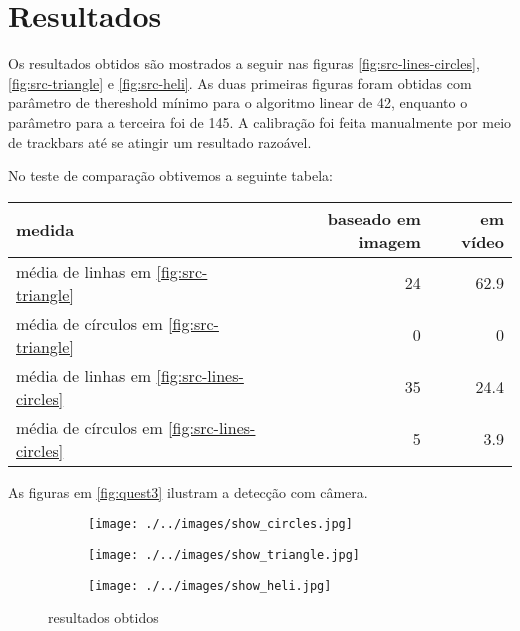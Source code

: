 \documentclass[journal]{IEEEtran}
\begin{document}
\section{Resultados}
Os resultados obtidos são mostrados a seguir nas figuras
\ref{fig:src-lines-circles}, \ref{fig:src-triangle} e \ref{fig:src-heli}. 
As duas primeiras figuras foram obtidas com parâmetro de thereshold mínimo
para o algoritmo linear de 42, enquanto o parâmetro para a terceira foi de 145.
A calibração foi feita manualmente por meio de trackbars até se atingir um resultado razoável.

No teste de comparação obtivemos a seguinte tabela:
\FloatBarrier
\begin{table}[!htp]
	\centering
	\begin{tabular}{|l|r|r|}\hline
	medida 						& baseado em imagem 					& em vídeo \\ \hline
	média de linhas em \ref{fig:src-triangle} & 24 & 62.9 \\ \hline
	média de círculos em \ref{fig:src-triangle} & 0 & 0\\ \hline
	média de linhas em \ref{fig:src-lines-circles} & 35 & 24.4\\ \hline
	média de círculos em \ref{fig:src-lines-circles} & 5 &3.9 \\ \hline	
	\end{tabular}
\end{table}
\FloatBarrier
As figuras em \ref{fig:quest3}  ilustram a detecção com câmera.
\FloatBarrier
\begin{figure}[!htp]
	\begin{subfigure}[!htp]{0.5\textwidth}
		\centering
		\texttt{[image: ./../images/show\_circles.jpg]}
		\caption{}
		\label{fig:show-lines-circles}
	\end{subfigure}
	\begin{subfigure}[!htp]{0.5\textwidth}
		\centering		
		\texttt{[image: ./../images/show\_triangle.jpg]}
		\caption{}
		\label{fig:show-triangle}
	\end{subfigure}
	\begin{subfigure}[!htp]{0.5\textwidth}
		\centering		
		\texttt{[image: ./../images/show\_heli.jpg]}
		\caption{}
		\label{fig:show-heli}
	\end{subfigure}
	\caption{resultados obtidos}
	\label{fig:results}
\end{figure}
\FloatBarrier
\end{document}

